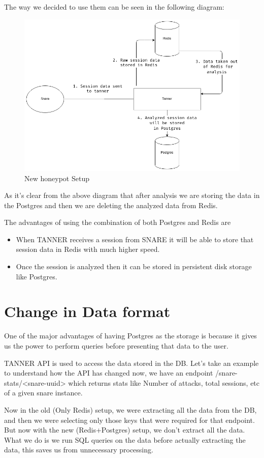 The way we decided to use them can be seen in the following diagram:
\begin{figure}[h!]
    \centering
    \includegraphics[width=.9\textwidth]{new-setup}
    \caption{New honeypot Setup}
    \label{fig:2}
\end{figure}
As it's clear from the above diagram that after analysis we are storing the data in the Postgres and then we are deleting the analyzed data from Redis.

The advantages of using the combination of both Postgres and Redis are
\begin{itemize}
    \item When TANNER receives a session from SNARE it will be able to store that session data in Redis with much higher speed.

    \item Once the session is analyzed then it can be stored in persistent disk storage like Postgres.
\end{itemize}
\section{Change in Data format}
One of the major advantages of having Postgres as the storage is because it gives us the power to perform queries before presenting that data to the user.

TANNER API is used to access the data stored in the DB. Let's take an example to understand how the API has changed now, we have an endpoint /snare-stats/<snare-uuid> which returns stats like Number of attacks, total sessions, etc of a given snare instance.

Now in the old (Only Redis) setup, we were extracting all the data from the DB, and then we were selecting only those keys that were required for that endpoint. But now with the new (Redis+Postgres) setup, we don't extract all the data. What we do is we run SQL queries on the data before actually extracting the data, this saves us from unnecessary processing.

